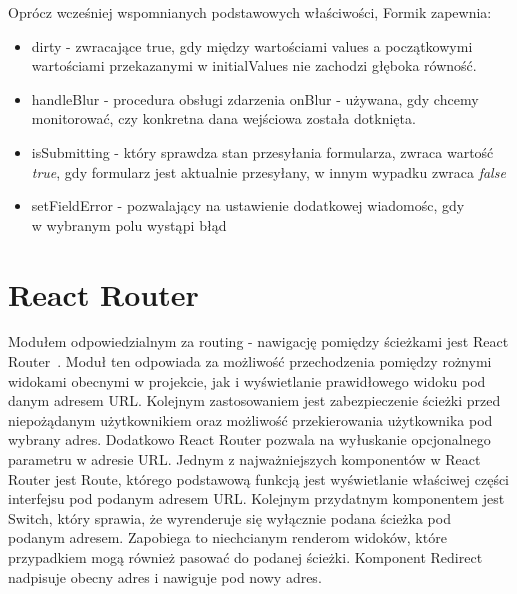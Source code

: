 \documentclass[oneside,polski,logo,indent]{amuthesis}
\begin{document}
Oprócz wcześniej wspomnianych podstawowych właściwości, Formik zapewnia:
\begin{itemize}
\item dirty - zwracające true, gdy między wartościami values a początkowymi wartościami przekazanymi w initialValues nie zachodzi głęboka równość.
\item handleBlur - procedura obsługi zdarzenia onBlur - używana, gdy chcemy monitorować, czy konkretna dana wejściowa została dotknięta.
\item isSubmitting - który sprawdza stan przesyłania formularza, zwraca wartość {\it true}, gdy formularz jest aktualnie przesyłany, w innym wypadku zwraca {\it false}
\item setFieldError - pozwalający na ustawienie dodatkowej wiadomośc, gdy \\w wybranym polu wystąpi błąd
\end{itemize}





\section{React Router}
Modułem odpowiedzialnym za routing - nawigację pomiędzy ścieżkami jest React Router~\cite{reactrouter}. Moduł ten odpowiada za
możliwość przechodzenia pomiędzy rożnymi widokami obecnymi w projekcie, jak i wyświetlanie prawidłowego widoku pod danym adresem URL.
Kolejnym zastosowaniem jest zabezpieczenie ścieżki przed niepożądanym użytkownikiem oraz możliwość przekierowania użytkownika pod wybrany adres.
Dodatkowo React Router pozwala na wyłuskanie opcjonalnego parametru w adresie URL.
\newline
\newline
Jednym z najważniejszych komponentów w React Router jest Route, którego podstawową funkcją jest wyświetlanie właściwej części interfejsu pod podanym adresem URL.
Kolejnym przydatnym komponentem jest Switch, który sprawia, że wyrenderuje się wyłącznie podana ścieżka pod podanym adresem. Zapobiega to niechcianym renderom widoków, które przypadkiem mogą również pasować do podanej ścieżki. Komponent Redirect nadpisuje obecny adres i nawiguje pod nowy adres.
\end{document}
